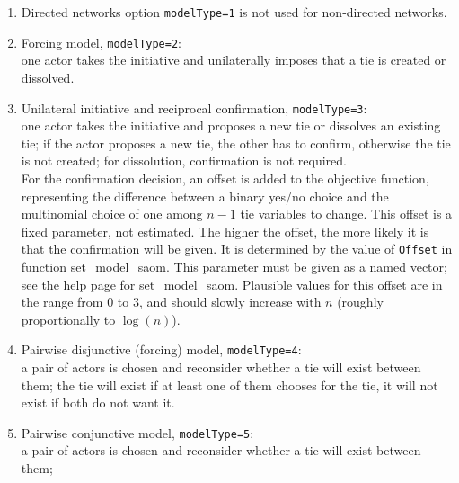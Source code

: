 \documentclass[a4paper,fleqn,11pt]{article}
\newcommand{\+}{\, + \,}
\begin{document}
\begin{enumerate}
\item Directed networks option \texttt{modelType=1} is not used for non-directed networks.
\item Forcing model, \texttt{modelType=2}: \\ %
      one actor takes the initiative and unilaterally
      imposes that a tie is created or dissolved.
\item Unilateral initiative and reciprocal confirmation,
      \texttt{modelType=3}:\\ %
      one actor takes the initiative and proposes a new tie
      or dissolves an existing tie; if the actor proposes a new tie, the other
      has to confirm, otherwise the tie is not created;
      for dissolution, confirmation is not required.\\
      For the confirmation decision, an offset is added to the objective
      function, representing the difference between a binary yes/no choice
      and the multinomial choice of one among $n-1$ tie variables to change.
      This offset is a fixed parameter, not estimated.
      The higher the offset, the more likely it is that the confirmation
      will be given. It is determined
      by the value of \texttt{Offset} in function
      \textsf{set\_model\_saom}. This parameter must be given as a
      named vector; see the help page for \textsf{set\_model\_saom}.
      Plausible values for this offset are in the range from 0 to 3,
      and should slowly increase with $n$ (roughly proportionally to $\log(n)$).

\item Pairwise disjunctive (forcing) model, \texttt{modelType=4}:\\ %
      a pair of actors is chosen and reconsider
      whether a tie will exist between them;
      the tie will exist if at least one of them chooses for the tie,
      it will not exist if both do not want it.
\item Pairwise conjunctive model, \texttt{modelType=5}:\\  %
      a pair of actors is chosen and reconsider
      whether a tie will exist between them;

\end{enumerate}
\end{document}
